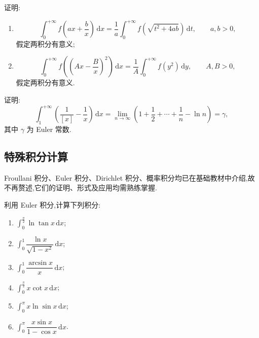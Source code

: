 \documentclass[../数学分析培优讲义.tex]{subfiles}
\begin{document}
\begin{example}
证明:
\begin{enumerate}[label=(\arabic*)]
    \item
    \[
        \int_0^{+\infty}f\left(ax+\dfrac{b}{x}\right)\,\mathrm{d}x
        =\dfrac{1}{a}\int_0^{+\infty}f\left(\sqrt{t^2+4ab}\right)\,\mathrm{d}t,
        \qquad a,b>0,
    \]
    假定两积分有意义;
    \item
    \[
        \int_0^{+\infty}f\left(\left(Ax-\dfrac{B}{x}\right)^2\right)\,\mathrm{d}x
        =\dfrac{1}{A}\int_0^{+\infty}f(y^2)\,\mathrm{d}y,
        \qquad A,B>0,
    \]
    假定两积分有意义.
\end{enumerate}
\end{example}
\exampleblank

\begin{example}[\markstar]
证明:
\[
    \int_1^{+\infty}\left(\dfrac{1}{[x]}-\dfrac{1}{x}\right)\,\mathrm{d}x
    =\lim\limits_{n\to\infty}\left(1+\dfrac{1}{2}+\cdots+\dfrac{1}{n}-\ln n\right)
    =\gamma,
\]
其中 $\gamma$ 为 Euler 常数.
\end{example}
\exampleblank


\newpage

\subsection{特殊积分计算}

Froullani 积分、Euler 积分、Dirichlet 积分、概率积分均已在基础教材中介绍,故不再赘述,它们的证明、形式及应用均需熟练掌握.

\begin{example}
利用 Euler 积分,计算下列积分:
\begin{enumerate}[label=(\arabic*)]
    \item $\displaystyle\int_0^{\frac{\pi}{2}}\ln\tan x\,\mathrm{d}x$;
    \item $\displaystyle\int_0^1\dfrac{\ln x}{\sqrt{1-x^2}}\,\mathrm{d}x$;
    \item $\displaystyle\int_0^1\dfrac{\arcsin x}{x}\,\mathrm{d}x$;
    \item $\displaystyle\int_0^{\frac{\pi}{2}}x\cot x\,\mathrm{d}x$;
    \item $\displaystyle\int_0^\pi x\ln\sin x\,\mathrm{d}x$;
    \item $\displaystyle\int_0^\pi\dfrac{x\sin x}{1-\cos x}\,\mathrm{d}x$.
\end{enumerate}
\end{example}
\exampleblank
\end{document}
